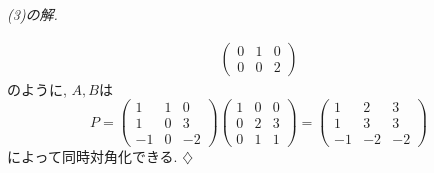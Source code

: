 \documentclass[titlepage]{jsarticle}
\numberwithin{equation}{section}
\newenvironment{kaitou}[1][解]{%
\begin{proofbox}%
\textit{#1. }\ignorespaces
}{%
\hfill$\diamondsuit$%
\end{proofbox}%
}
\begin{document}
\begin{kaitou}[(3)の解]
\begin{align*}
\begin{pmatrix}
0 & 1 & 0\\
0 & 0 & 2
\end{pmatrix}
\end{align*}
のように, $A, B$は
\[
P =
\begin{pmatrix}
1 & 1 & 0\\
1 & 0 & 3\\
-1 & 0 & -2
\end{pmatrix}
\begin{pmatrix}
1 & 0 & 0\\
0 & 2 & 3\\
0 & 1 & 1
\end{pmatrix}
=
\boxed{
\begin{pmatrix}
1 & 2 & 3\\
1 & 3 & 3\\
-1 & -2 & -2
\end{pmatrix}
}
\]
によって同時対角化できる.
\end{kaitou}
\end{document}
